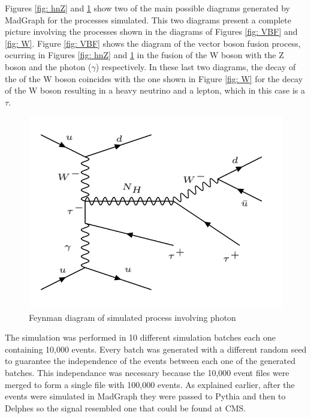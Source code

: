 Figures \ref{fig: hnZ} and \ref{fig: hnGamma} show two of the main possible diagrams generated by MadGraph for the processes simulated. This two diagrams present a complete picture involving the processes shown in the diagrams of Figures \ref{fig: VBF} and \ref{fig: W}. Figure \ref{fig: VBF} shows the diagram of the vector boson fusion process, ocurring in Figures \ref{fig: hnZ} and \ref{fig: hnGamma} in the fusion of the W boson with the Z boson and the photon ($\gamma$) respectively. In these last two diagrams, the decay of the of the W boson coincides with the one shown in Figure \ref{fig: W} for the decay of the W boson resulting in a heavy neutrino and a lepton, which in this case is a $\tau$.

\begin{figure}[H]
\centering
\includegraphics[scale = 0.45]{Figures/Feynman_hnGamma}
\caption{Feynman diagram of simulated process involving photon}
\label{fig: hnGamma}
\end{figure}

The simulation was performed in 10 different simulation batches each one containing 10,000 events. Every batch was generated with a different random seed to guarantee the independence of the events between each one of the generated batches. This independance was necessary because the 10,000 event files were merged to form a single file with 100,000 events. As explained earlier, after the events were simulated in MadGraph they were passed to Pythia and then to Delphes so the signal resembled one that could be found at CMS.  

